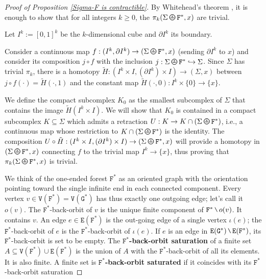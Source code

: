 \documentclass[11pt]{amsart}
\theoremstyle{definition}
\theoremstyle{plain}
\newcommand{\<}{\langle}
\renewcommand{\>}{\rangle}
\newcommand{\define}[1]{\textbf{#1}}
\newcommand\GGG{\mathtt{G}}
\newcommand\VVV{\mathtt{V}}
\newcommand\EEE{\mathtt{E}}
\newcommand{\oPerpStar}{\begin{tikzpicture}[scale=0.134]
\draw[thick,line width=0.7pt](-0.6,-0.2)--(0.6,-0.2) ;
    \draw (0,0.1) node[scale=0.6] {\rm{*}};
  \draw[line width=0.7pt] (0,0) circle [radius=1];
\end{tikzpicture}}
\newcommand{\oPerpstar}{\mathbin{\raisebox{-1pt}{\oPerpStar}}}
\newcommand{\mysetminusD}{\hbox{\tikz{\draw[line width=0.6pt,line cap=round] (3pt,0) -- (0,6pt);}}}
\newcommand{\mysetminusT}{\mysetminusD}
\newcommand{\mysetminusS}{\hbox{\tikz{\draw[line width=0.45pt,line cap=round] (2pt,0) -- (0,4pt);}}}
\newcommand{\mysetminusSS}{\hbox{\tikz{\draw[line width=0.4pt,line cap=round] (1.5pt,0) -- (0,3pt);}}}
\newcommand{\mysetminus}{\mathbin{\mathchoice{\mysetminusD}{\mysetminusT}{\mysetminusS}{\mysetminusSS}}}%
\begin{document}
\begin{proof}[Proof of Proposition \ref{Sigma-F is contractible}]
By Whitehead's theorem \cite{Whitehead-1949-1}, it is enough to show that for all integers $k\geq 0$, the $\pi_k({\Sigma}\oPerpstar {{\mathtt{F}^{*}}}, x)$ are trivial.

Let $I^k:=[0,1]^k$ be the $k$-dimensional cube and $\partial I^k$ its boundary.

Consider a continuous map $f:(I^k,\partial I^k)\to ({\Sigma}\oPerpstar {{\mathtt{F}^{*}}},x)$ (sending $\partial I^k$ to $x$) and consider its composition $j\circ f$ with the inclusion $j: {\Sigma}\oPerpstar {{\mathtt{F}^{*}}}\hookrightarrow {\Sigma} $.
Since $ {\Sigma} $ has trivial $\pi_k$, there is a homotopy $\tilde{H}: (I^k\times I, (\partial I^k)\times I) \to ({\Sigma} ,x)$
between $j\circ f(\cdot )=\tilde{H}(\cdot ,1)$ and the constant map $\tilde{H}(\cdot ,0): I^k\times\{0\}\to \{x\}$.

We define the compact subcomplex $K_0$ as the smallest subcomplex of ${\Sigma} $ that contains the image $\tilde{H}(I^k\times I)$.
We will show that $K_0$ is contained in a compact subcomplex $K\subseteq {\Sigma} $ which admits a retraction $U: K\to K\cap  ({\Sigma}\oPerpstar {{\mathtt{F}^{*}}})$, i.e., a continuous map whose restriction to $K\cap  ({\Sigma}\oPerpstar {{\mathtt{F}^{*}}})$ is the identity.
The composition $U\circ \tilde{H}: (I^k\times I, (\partial I^k)\times I) \to ({\Sigma}\oPerpstar {{\mathtt{F}^{*}}},x)$ will provide a homotopy in $({\Sigma}\oPerpstar {{\mathtt{F}^{*}}},x)$ connecting $f$ to the trivial map $I^k\to \{x\}$, thus proving that $\pi_k({\Sigma}\oPerpstar {{\mathtt{F}^{*}}},x)$ is trivial.

We think of the one-ended forest ${\mathtt{F}^{*}}$ as an oriented graph with the orientation pointing toward the single infinite end in each connected component.
Every vertex $v\in \VVV({\mathtt{F}^{*}})=\VVV({{\GGG}^*})$ has thus exactly one outgoing edge; let's call it $o(v)$.
The ${\mathtt{F}^{*}}$-back-orbit of $v$ is the unique finite component of ${\mathtt{F}^{*}}\mysetminus o(v)$. It contains $v$.
An edge $e\in \EEE({\mathtt{F}^{*}})$ is the out-going edge of a single vertex $\iota(e)$; the ${\mathtt{F}^{*}}$-back-orbit of $e$ is the ${\mathtt{F}^{*}}$-back-orbit of $\iota(e)$.
If $e$ is an edge in $\EEE({{\GGG}^*})\mysetminus \EEE({\mathtt{F}^{*}})$, its ${\mathtt{F}^{*}}$-back-orbit is set to be empty.
The \define{${\mathtt{F}^{*}}$-back-orbit saturation} of a finite set $A \subseteq \VVV({\mathtt{F}^{*}})\cup \EEE({\mathtt{F}^{*}})$ is the union of $A$ with the ${\mathtt{F}^{*}}$-back-orbit of all its elements.
It is also finite. A finite set is \define{${\mathtt{F}^{*}}$-back-orbit saturated} if it coincides with its ${\mathtt{F}^{*}}$-back-orbit saturation


\end{proof}
\end{document}
